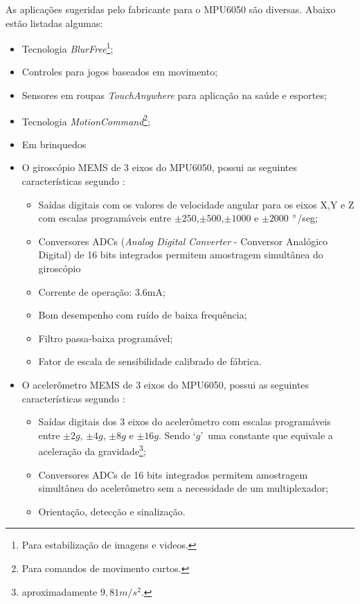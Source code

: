 	As aplicações sugeridas pelo fabricante para o MPU6050 são diversas. Abaixo estão listadas algumas:
	\begin{itemize}
		\item Tecnologia \textit{ BlurFree\texttrademark }\footnote{Para estabilização de imagens e videos.};
		\item Controles para jogos baseados em movimento;
		\item Sensores em roupas \textit{TouchAnywhere} para aplicação na saúde e esportes;
		\item Tecnologia \textit{ MotionCommand\texttrademark}\footnote{Para comandos de movimento curtos.}; 
		\item Em brinquedos
	\end{itemize}
	
	\begin{description}
		\item[Características do MPU6050]  
		\item \begin{itemize}	 
		
		\item O giroscópio MEMS de 3 eixos do MPU6050, possui as seguintes características segundo :
			\begin{itemize}
				\item Saídas digitais com os valores de velocidade angular para os eixos X,Y e Z com escalas programáveis entre $ \pm250 $,$ \pm500 $,$ \pm1000 $ e $ \pm 2000$ $\degree$/seg;
				\item Conversores ADCs (\textit{Analog Digital Converter} - Conversor Analógico Digital) de 16 bits integrados permitem amostragem simultânea do giroscópio
				\item Corrente de operação: 3.6mA;
				\item Bom desempenho com ruído de baixa frequência;
				\item Filtro passa-baixa programável;
				\item Fator de escala de sensibilidade calibrado de fábrica.
			\end{itemize}
			
		\item O acelerômetro MEMS de 3 eixos do MPU6050, possui as seguintes características segundo :
			\begin{itemize}
				\item Saídas digitais dos 3 eixos do acelerômetro com escalas programáveis entre $\pm2g$, $\pm4g$, $\pm8g$ e $\pm16g$. Sendo \textquoteleft$ g$\textquoteright \ uma constante que equivale a aceleração da gravidade\footnote{aproximadamente $9,81 m/s^2 $.};
				\item Conversores ADCs de 16 bits integrados permitem amostragem simultânea do acelerômetro sem a necessidade de um multiplexador;
				\item Orientação, detecção e sinalização.
				
			\end{itemize}
		\end{itemize}
	\end{description}
	
